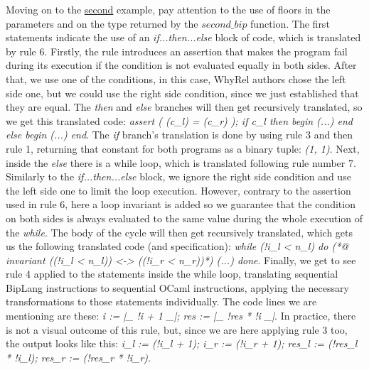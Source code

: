 Moving on to the \hyperref[fig:trans-ex-second]{second} example, pay attention to the use of floors in the parameters and on the type returned by the $second\_bip$ function.
The first statements indicate the use of an \emph{if...then...else} block of code, which is translated by rule 6.
Firstly, the rule introduces an assertion that makes the program fail during its execution if the condition is not evaluated equally in both sides.
After that, we use one of the conditions, in this case, WhyRel authors chose the left side one, but we could use the right side condition, since we just established that they are equal.
The \emph{then} and \emph{else} branches will then get recursively translated, so we get this translated code: \emph{assert ( (c\_l) = (c\_r) ); if c\_l then begin (...) end else begin (...) end}. 
The \emph{if} branch's translation is done by using rule 3 and then rule 1, returning that constant for both programs as a binary tuple: \emph{(1, 1)}.
Next, inside the \emph{else} there is a while loop, which is translated following rule number 7.
Similarly to the \emph{if...then...else} block, we ignore the right side condition and use the left side one to limit the loop execution.
However, contrary to the assertion used in rule 6, here a loop invariant is added so we guarantee that the condition on both sides is always evaluated to the same value during the whole execution of the \emph{while}.
The body of the cycle will then get recursively translated, which gets us the following translated code (and specification): \emph{while (!i\_l < n\_l) do (*@ invariant ((!i\_l < n\_l)) <-> ((!i\_r < n\_r))*) (...) done}.
Finally, we get to see rule 4 applied to the statements inside the while loop, translating sequential BipLang instructions to sequential OCaml instructions, applying the necessary transformations to those statements individually.
The code lines we are mentioning are these: \emph{i := |\_ !i + 1 \_|; res := |\_ !res * !i \_|}.
In practice, there is not a visual outcome of this rule, but, since we are here applying rule 3 too, the output looks like this: \emph{i\_l := (!i\_l + 1); i\_r := (!i\_r + 1); res\_l := (!res\_l * !i\_l); res\_r := (!res\_r * !i\_r)}.

